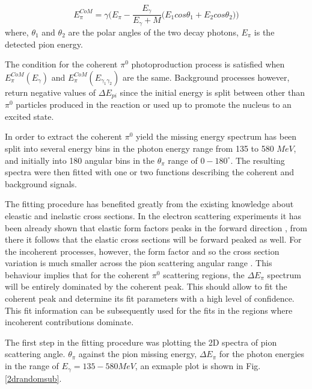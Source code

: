 \begin{equation}
E_{\pi}^{CoM} = \gamma\Big(E_{\pi}-\frac{E_{\gamma}}{E_{\gamma}+M}\big(E_{1}cos\theta_{1}+E_{2}cos\theta_{2}\big)\Big)
\end{equation}
where, $\theta_{1}$ and $\theta_{2}$ are the polar angles of the two decay photons, $E_{\pi}$ is the detected pion energy.

\indent The condition for the coherent $\pi^{0}$ photoproduction process is satisfied when $E_{\pi}^{CoM}(E_{\gamma})$ and $E_{\pi}^{CoM}(E_{\gamma_{1}\gamma_{2}})$ are the same. Background processes however, return negative values of $\Delta E_{pi}$ since the initial energy is split between other than $\pi^{0}$ particles produced in the reaction or used up to promote the nucleus to an excited state.

\indent In order to extract the coherent $\pi^{0}$ yield the missing energy spectrum has been split into several energy bins in the photon energy range from 135 to 580 $MeV$, and initially into 180 angular bins in the $\theta_{\pi}$ range of $0-180^{\circ}$. The resulting spectra were then fitted with one or two functions describing the coherent and background signals.

\indent The fitting procedure has benefited greatly from the existing knowledge about eleastic and inelastic cross sections. In the electron scattering experiments it has been already shown that elastic form factors peaks in the forward direction \cite{isick}, from there it follows that the elastic cross sections will be forward peaked as well. For the incoherent processes, however, the form factor and so the cross section variation is much smaller across the pion scattering angular range \cite{takaki}. This behaviour implies that for the coherent $\pi^{0}$ scattering regions, the $\Delta E_{\pi}$ spectrum will be entirely dominated by the coherent peak. This should allow to fit the coherent peak and determine its fit parameters with a high level of confidence. This fit information can be subsequently used for the fits in the regions where incoherent contributions dominate.

\indent The first step in the fitting procedure was plotting the 2D spectra of pion scattering angle. $\theta_{\pi}$ against the pion missing energy, $\Delta E_{\pi}$ for the photon energies in the range of $E_{\gamma} = 135 - 580 MeV$, an exmaple plot is shown in Fig. \ref{2drandomsub}.

